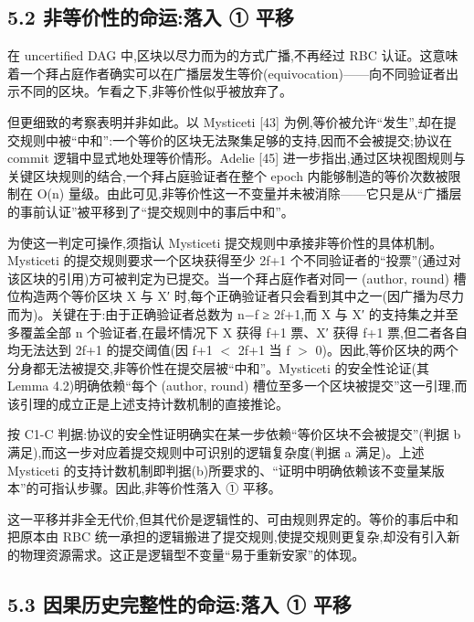 \documentclass[UTF8,fontset=windows,a4paper,11pt]{ctexart}
\begin{document}
\subsection{5.2 非等价性的命运:落入 ①
平移}\label{ux975eux7b49ux4ef7ux6027ux7684ux547dux8fd0ux843dux5165-ux2460-ux5e73ux79fb}

在 uncertified DAG 中,区块以尽力而为的方式广播,不再经过 RBC
认证。这意味着一个拜占庭作者确实可以在广播层发生等价(equivocation)------向不同验证者出示不同的区块。乍看之下,非等价性似乎被放弃了。

但更细致的考察表明并非如此。以 Mysticeti {[}43{]}
为例,等价被允许``发生'',却在提交规则中被``中和'':一个等价的区块无法聚集足够的支持,因而不会被提交;协议在
commit 逻辑中显式地处理等价情形。Adelie {[}45{]}
进一步指出,通过区块视图规则与关键区块规则的结合,一个拜占庭验证者在整个
epoch 内能够制造的等价次数被限制在 O(n)
量级。由此可见,非等价性这一不变量并未被消除------它只是从``广播层的事前认证''被平移到了``提交规则中的事后中和''。

为使这一判定可操作,须指认 Mysticeti 提交规则中承接非等价性的具体机制。Mysticeti 的提交规则要求一个区块获得至少 2f+1 个不同验证者的``投票''(通过对该区块的引用)方可被判定为已提交。当一个拜占庭作者对同一 (author, round) 槽位构造两个等价区块 X 与 X′ 时,每个正确验证者只会看到其中之一(因广播为尽力而为)。关键在于:由于正确验证者总数为 n−f ≥ 2f+1,而 X 与 X′ 的支持集之并至多覆盖全部 n 个验证者,在最坏情况下 X 获得 f+1 票、X′ 获得 f+1 票,但二者各自均无法达到 2f+1 的提交阈值(因 f+1 $<$ 2f+1 当 f $>$ 0)。因此,等价区块的两个分身都无法被提交,非等价性在提交层被``中和''。Mysticeti 的安全性论证(其 Lemma 4.2)明确依赖``每个 (author, round) 槽位至多一个区块被提交''这一引理,而该引理的成立正是上述支持计数机制的直接推论。

按 C1-C 判据:协议的安全性证明确实在某一步依赖``等价区块不会被提交''(判据 b
满足),而这一步对应着提交规则中可识别的逻辑复杂度(判据 a
满足)。上述 Mysticeti 的支持计数机制即判据(b)所要求的、``证明中明确依赖该不变量某版本''的可指认步骤。因此,非等价性落入
① 平移。

这一平移并非全无代价,但其代价是逻辑性的、可由规则界定的。等价的事后中和把原本由
RBC
统一承担的逻辑搬进了提交规则,使提交规则更复杂,却没有引入新的物理资源需求。这正是逻辑型不变量``易于重新安家''的体现。

\subsection{5.3 因果历史完整性的命运:落入 ①
平移}\label{ux56e0ux679cux5386ux53f2ux5b8cux6574ux6027ux7684ux547dux8fd0ux843dux5165-ux2460-ux5e73ux79fb}
\end{document}
